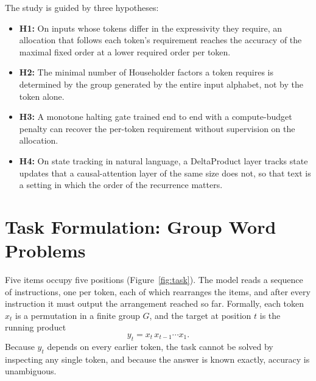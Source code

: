 The study is guided by three hypotheses:
\begin{itemize}[itemsep=1pt,topsep=3pt]
	\item \textbf{H1:} On inputs whose tokens differ in the expressivity they require, an allocation that follows each token's requirement reaches the accuracy of the maximal fixed order at a lower required order per token.
	\item \textbf{H2:} The minimal number of Householder factors a token requires is determined by the group generated by the entire input alphabet, not by the token alone.
	\item \textbf{H3:} A monotone halting gate trained end to end with a compute-budget penalty can recover the per-token requirement without supervision on the allocation.
	\item \textbf{H4:} On state tracking in natural language, a DeltaProduct layer tracks state updates that a causal-attention layer of the same size does not, so that text is a setting in which the order of the recurrence matters.
\end{itemize}

\section{Task Formulation: Group Word Problems}
\label{sec:task}
Five items occupy five positions (Figure~\ref{fig:task}). The model reads a sequence of instructions, one per token, each of which rearranges the items, and after every instruction it must output the arrangement reached so far. Formally, each token $x_t$ is a permutation in a finite group $G$, and the target at position $t$ is the running product
\begin{equation}
y_t = x_t\, x_{t-1} \cdots x_1 .
\label{eq:target}
\end{equation}
Because $y_t$ depends on every earlier token, the task cannot be solved by inspecting any single token, and because the answer is known exactly, accuracy is unambiguous.

